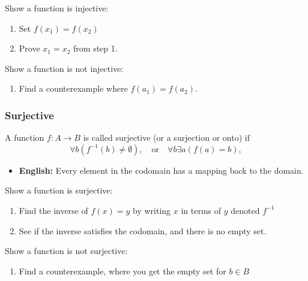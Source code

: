     \begin{process}
        Show a function is injective:
        \begin{enumerate}
            \item Set $f(x_1) = f(x_2)$
            \item Prove $x_1 = x_2$ from step 1. 
        \end{enumerate}
        \vspace{1em}

        Show a function is not injective:
        \begin{enumerate}
            \item Find a counterexample where $f(a_1) = f(a_2)$.
        \end{enumerate}
    \end{process}

    \subsubsection{Surjective}
    \begin{definition}
        A function \( f: A \to B \) is called surjective (or a surjection or onto) if 
        \[
        \forall b (f^{-1}(b) \neq \emptyset), \quad \text{or} \quad \forall b \exists a (f(a) = b),
        \]
        \begin{itemize}
            \item \textbf{English:} Every element in the codomain has a mapping back to the domain.
        \end{itemize}

    \end{definition}

    \begin{process}
        Show a function is surjective:
        \begin{enumerate}
            \item Find the inverse of $f(x)=y$ by writing $x$ in terms of $y$ denoted $f^{-1}$
            \item See if the inverse satisfies the codomain, and there is no empty set.
        \end{enumerate}
        \vspace{1em}

        Show a function is not surjective:
        \begin{enumerate}
            \item Find a counterexample, where you get the empty set for $b\in B$
        \end{enumerate}
    \end{process}

